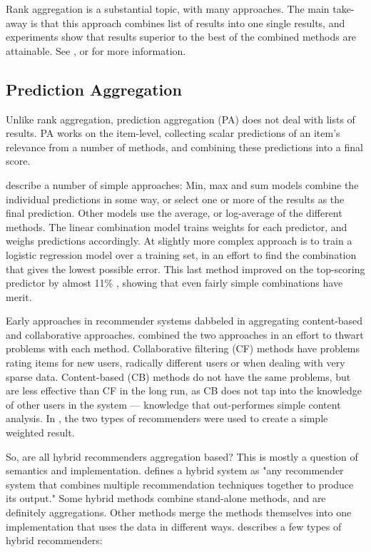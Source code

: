Rank aggregation is a substantial topic, with many approaches.
The main take-away is that this approach combines list of results
into one single results, and experiments show that results superior
to the best of the combined methods are attainable.
See \cite{Aslam2001}, \cite{Liu2007} or \cite{Klementiev2008} 
for more information.


\subsection{Prediction Aggregation}

Unlike rank aggregation, prediction aggregation (PA) does not deal with lists of results.
PA works on the item-level, collecting scalar predictions of an item's relevance from a number of methods,
and combining these predictions into a final score.

\cite{Aslam2001} describe a number of simple approaches:
Min, max and sum models combine the individual predictions in some way, 
or select one or more of the results as the final prediction. 
Other models use the average, or log-average of the different methods.
The linear combination model trains weights for each predictor, and weighs predictions accordingly.
At slightly more complex approach is to train a logistic regression model \cite[p3]{Aslam2001}
over a training set, in an effort to find the combination that gives the lowest possible error.
This last method improved on the top-scoring predictor by almost 11\% \cite[p3]{Aslam2001},
showing that even fairly simple combinations have merit.

Early approaches in recommender systems dabbeled in aggregating content-based and collaborative approaches.
\cite{Claypool1999} combined the two approaches in an effort to thwart problems with each method.
Collaborative filtering (CF) methods have problems rating items for new users, radically different users or when dealing with very sparse data.
Content-based (CB) methods do not have the same problems, but are less effective than CF in the long run, as CB does not tap into the 
knowledge of other users in the system --- knowledge that out-performes simple content analysis.
In \cite{Claypool1999}, the two types of recommenders were used to create a simple weighted result.

So, are all hybrid recommenders aggregation based? This is mostly a question of semantics and implementation.
\cite[p4]{Burke2007} defines a hybrid system as "any recommender system that combines multiple recommendation techniques together to produce its output."
Some hybrid methods combine stand-alone methods, and are definitely aggregations.
Other methods merge the methods themselves into one implementation that uses the data in different ways.
\cite[p4]{Burke2007} describes a few types of hybrid recommenders:

